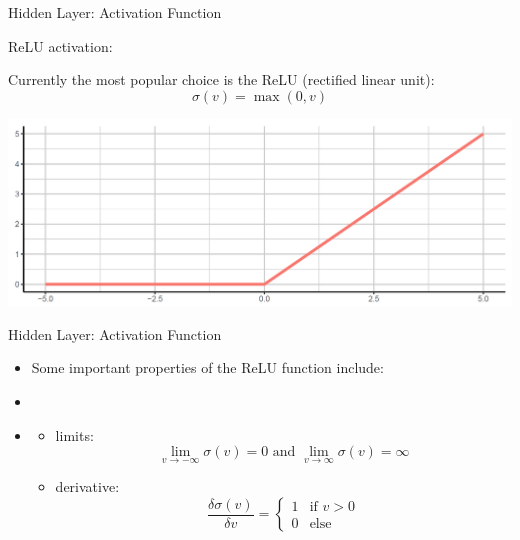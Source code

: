 \begin{frame} {Hidden Layer: Activation Function}
  \begin{blocki}{ReLU activation:}
    \item Currently the most popular choice is the ReLU (rectified linear unit):
    $$ \sigma (v) = \max(0,v) $$
  \end{blocki}
  
\begin{center}
\includegraphics[width=1\textwidth]{plots/ReLU.png}
\end{center}

\end{frame}

\begin{frame} {Hidden Layer: Activation Function}
  \begin{itemize}
    \item Some important properties of the ReLU function include:
    \item[]
    \item[]
    \begin{itemize}
      \item limits: $$\lim_{v \to -\infty} \sigma(v) = 0 \text{ and } \lim_{v \to \infty} \sigma(v) = \infty$$
      \item derivative: 
      $$\frac{\delta\sigma(v)}{\delta v} =
        \begin{cases}
                                       1 & \text{if $v > 0$} \\
                                       0 & \text{else}
        \end{cases}
      $$
    \end{itemize}
  \end{itemize}
\end{frame}

